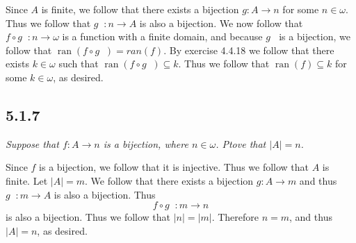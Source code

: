 \documentclass[11pt,oneside,titlepage]{book}
\DeclareMathOperator \inv {^{-1}}
\DeclareMathOperator \ran {ran}
\begin{document}
Since $A$ is finite, we follow that there exists a bijection $g: A \to n$
for some $n \in \omega$. Thus we follow that $g \inv: n \to A$ is also a bijection.
We now follow that $f \circ g\inv: n \to \omega $ is a function with a finite domain, and
because $g\inv$ is a bijection, we follow that $\ran(f \circ g\inv) = ran(f)$.
By exercise 4.4.18 we follow that there exists $k \in \omega$ such that
$\ran(f \circ g\inv) \subseteq k$. Thus we follow that $\ran(f) \subseteq k$ for some
$k \in \omega$, as desired.

\subsection*{5.1.7}

\textit{Suppose that $f: A \to n$ is a bijection, where $n \in \omega$. Ptove that $|A| = n$.}

Since $f$ is a bijection, we follow that it is injective. Thus we follow that $A$ is finite.
Let $|A| = m$. We follow that there exists a bijection $g: A \to m$ and thus $g \inv: m \to A$
is also a bijection. Thus
$$f \circ g \inv: m \to n$$
is also a bijection. Thus we follow that $|n| = |m|$. Therefore $n = m$, and thus $|A| = n$,
as desired.
\end{document}
